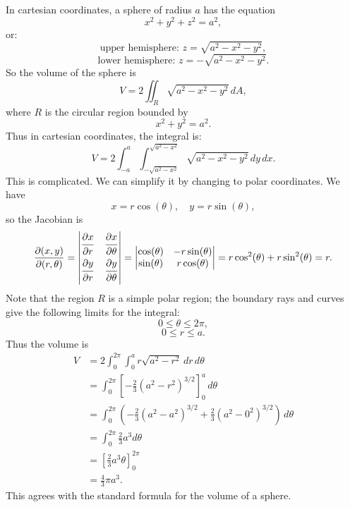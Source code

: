   \begin{example}
    In cartesian coordinates, a sphere of radius $a$ has the equation
      \[
        x^2 + y^2 + z^2 = a^2,
      \]
    or:
      \[
        \text{upper hemisphere: } z = \sqrt{a^2 - x^2 - y^2},
      \]
      \[
        \text{lower hemisphere: } z = - \sqrt{a^2 - x^2 - y^2}.
      \]
    So the volume of the sphere is
      \[
        V = 2\iint_R \sqrt{a^2 - x^2 - y^2} \, dA,
      \]
    where $R$ is the circular region bounded by
      \[
        x^2 + y^2 = a^2.
      \]
    Thus in cartesian coordinates, the integral is:
      \[
        V = 2\int\nolimits_{-a}^a \int\nolimits_{-\sqrt{a^2 - x^2}}^{\sqrt{a^2 - x^2}} \sqrt{a^2 - x^2 - y^2} \, dy \, dx.
      \]
    This is complicated.  We can simplify it by changing to polar coordinates.  We have
      \[
        x = r\cos(\theta), \quad y = r\sin(\theta),
      \]
    so the Jacobian is
    \[
      \frac{\partial(x, y)}{\partial(r, \theta)} = \left|
      \begin{matrix}
        \dfrac{\strut\partial x}{\strut\partial r} & \dfrac{\strut\partial x}{\strut\partial \theta}  \\
        \dfrac{\strut\partial y}{\strut\partial r} & \dfrac{\strut\partial y}{\strut\partial \theta}
      \end{matrix}
      \right| =
      \left|
      \begin{matrix}
        \cos(\theta) & -r\sin(\theta)  \\
        \sin(\theta) & r\cos(\theta)
      \end{matrix}
      \right| = r\cos^2(\theta) + r\sin^2(\theta) = r.
    \]
    Note that the region $R$ is a simple polar region; the boundary rays and curves give the following limits for the integral:
      \[
        0 \leq \theta \leq 2\pi,
      \]    
      \[
        0 \leq r \leq a.
      \]
    Thus the volume is
      \begin{align*}
        V & = 2\int_0^{2\pi} \int_0^a r\sqrt{a^2 - r^2} \, dr \, d\theta  \\
        & = \int_0^{2\pi} \left[-\frac{2}{3} (a^2 - r^2)^{3/2}\right]_0^a \, d\theta  \\
        & = \int_0^{2\pi} \left(-\frac{2}{3}(a^2 - a^2)^{3/2} + \frac{2}{3}(a^2 - 0^2)^{3/2}\right) \, d\theta  \\
        & = \int_0^{2\pi} \frac{2}{3}a^3 d\theta  \\
        & = \left[\frac{2}{3}a^3\theta\right]_0^{2\pi}  \\
        & = \frac{4}{3}\pi a^3.
      \end{align*}
    This agrees with the standard formula for the volume of a sphere.
  \end{example}

